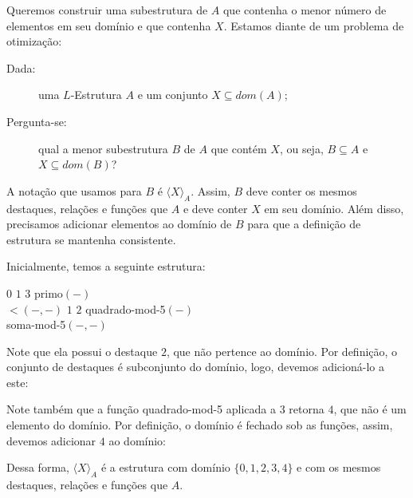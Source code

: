 Queremos construir uma subestrutura de $A$ que contenha o menor número de elementos em seu domínio e que contenha $X$. Estamos diante de um problema de otimização:

\begin{description}
    \item[Dada:] uma $L$-Estrutura $A$ e um conjunto $X \subseteq dom(A)$;
    \item[Pergunta-se:] qual a menor subestrutura $B$ de $A$ que contém $X$, ou seja, $B \subseteq A$ e $X \subseteq dom(B)$?   
\end{description}
A notação que usamos para $B$ é $\langle X \rangle_A$. Assim, $B$ deve conter os mesmos destaques, relações e funções que $A$ e deve conter $X$ em seu domínio. Além disso, precisamos adicionar elementos ao domínio de $B$ para que a definição de estrutura se mantenha consistente. 

Inicialmente, temos a seguinte estrutura:
\begin{center}
    \begin{structure}
        {}
        {$0$ $1$ $3$}
        {primo$(-)$\\$<$$(-,-)$}
        {$1$ $2$}
        {quadrado-mod-5$(-)$\\soma-mod-5$(-,-)$}
    \end{structure} 
\end{center}

Note que ela possui o destaque $2$, que não pertence ao domínio. Por definição, o conjunto de destaques é subconjunto do domínio, logo, devemos adicioná-lo a este:
\begin{center}
\end{center}

Note também que a função quadrado-mod-5 aplicada a $3$ retorna $4$, que não é um elemento do domínio. Por definição, o domínio é fechado sob as funções, assim, devemos adicionar $4$ ao domínio:

\begin{center}
\end{center}

Dessa forma, $\langle X \rangle_A$ é a estrutura com domínio $\{0,1,2,3,4\}$ e com os mesmos destaques, relações e funções que $A$. 

